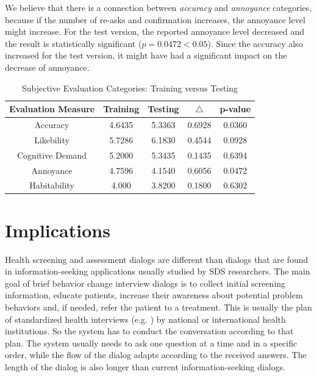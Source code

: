 \begin{sloppy}
We believe that there is a connection between \textit{accuracy} and \textit{annoyance} categories, because if the number of re-asks and confirmation increases, the annoyance level might increase. For the test version, the reported annoyance level decreased and the result is statistically significant ($p=0.0472<0.05$). Since the accuracy also increased for the test version, it might have had a significant impact on the decrease of annoyance. 
 
\begin{table}
 \caption{Subjective Evaluation Categories: Training versus Testing} \label{SASSIPVal}
 \begin{tabular}{ | c | c | c | c | c | }
    \hline
    Evaluation Measure & Training & Testing & $\triangle$ & p-value \\ \hline
    Accuracy & 4.6435 & 5.3363 & 0.6928 & 0.0360  \\ \hline
    Likebility & 5.7286 & 6.1830 & 0.4544 & 0.0928 \\ \hline
    Cognitive Demand & 5.2000 & 5.3435 & 0.1435 & 0.6394 \\ \hline
    Annoyance & 4.7596 & 4.1540 & 0.6056 & 0.0472 \\ \hline
    Habitability & 4.000 & 3.8200 & 0.1800 & 0.6302 \\ \hline
    \end{tabular}
    \end{table} 


\section{Implications}

Health screening and assessment dialogs are different than dialogs that are found in information-seeking applications usually studied by SDS researchers. The main goal of brief behavior change interview dialogs is to collect initial screening information, educate patients, increase their awareness about potential problem behaviors and, if needed, refer the patient to a treatment. This is usually the plan of standardized health interviews (e.g.  \cite{humeniuk2010assist,steinberg2005brief,national2007helping}) by national or international health institutions. So the system has to conduct the conversation according to that plan. The system usually needs to ask one question at a time and in a specific order, while the flow of the dialog adapts according to the received answers. The length of the dialog is also longer than current information-seeking dialogs. 
 

\end{sloppy}
